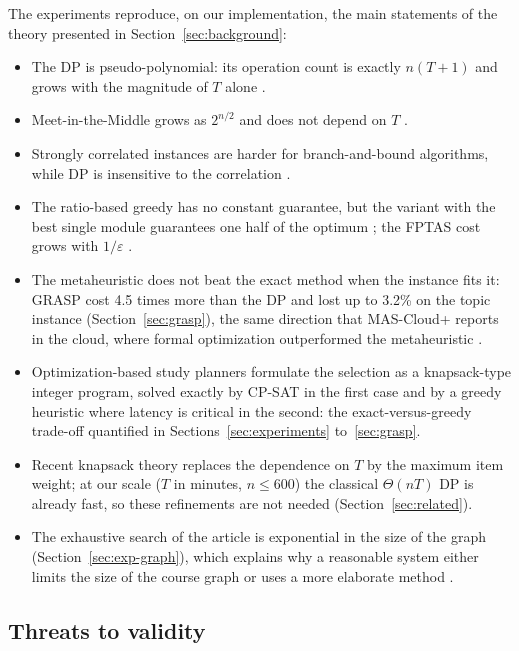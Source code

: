 The experiments reproduce, on our implementation, the main statements of the theory presented in Section~\ref{sec:background}:
\begin{itemize}[leftmargin=1.4em,itemsep=2pt]
\item The DP is pseudo-polynomial: its operation count is exactly $n(T+1)$ and grows with the magnitude of $T$ alone \cite{garey1979,kellerer2004}.
\item Meet-in-the-Middle grows as $2^{n/2}$ and does not depend on $T$ \cite{horowitz1974}.
\item Strongly correlated instances are harder for branch-and-bound algorithms, while DP is insensitive to the correlation \cite{pisinger2005}.
\item The ratio-based greedy has no constant guarantee, but the variant with the best single module guarantees one half of the optimum \cite{kellerer2004}; the FPTAS cost grows with $1/\varepsilon$ \cite{ibarra1975,lawler1979}.
\item The metaheuristic does not beat the exact method when the instance fits it: GRASP cost 4.5 times more than the DP and lost up to 3.2\% on the topic instance (Section~\ref{sec:grasp}), the same direction that MAS-Cloud+ reports in the cloud, where formal optimization outperformed the metaheuristic \cite{mendes2022mascloud}.
\item Optimization-based study planners \cite{bose2026learnopt,mehrabi2025evidence} formulate the selection as a knapsack-type integer program, solved exactly by CP-SAT in the first case and by a greedy heuristic where latency is critical in the second: the exact-versus-greedy trade-off quantified in Sections~\ref{sec:experiments} to~\ref{sec:grasp}.
\item Recent knapsack theory \cite{cygan2019minconv,bringmann2024small,jin2024knapsack} replaces the dependence on $T$ by the maximum item weight; at our scale ($T$ in minutes, $n\le600$) the classical $\Theta(nT)$ DP is already fast, so these refinements are not needed (Section~\ref{sec:related}).
\item The exhaustive search of the article is exponential in the size of the graph (Section~\ref{sec:exp-graph}), which explains why a reasonable system either limits the size of the course graph or uses a more elaborate method \cite{nabizadeh2017rutico}.
\end{itemize}

\subsection{Threats to validity}

